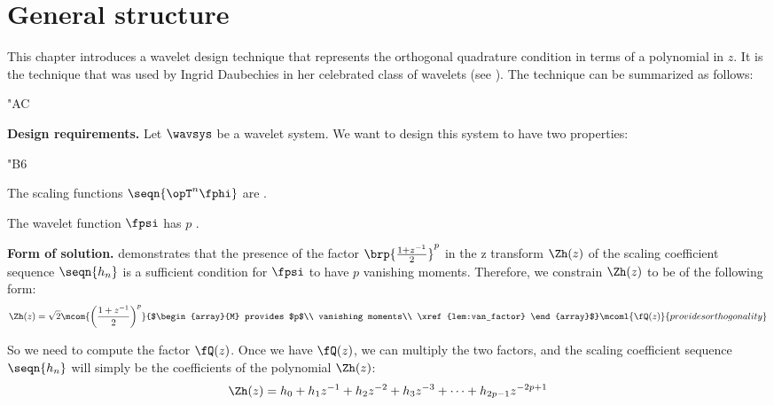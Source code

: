 \section{General structure}
This chapter introduces a wavelet design technique that represents the
orthogonal quadrature condition in terms of a polynomial in $z$.
It is the technique that was used by Ingrid Daubechies in her celebrated
 class of wavelets (see ).
The technique can be summarized as follows:
\begin{dingautolist}{"AC}
  \item \textbf{Design requirements.}
        Let $\wavsys$ be a wavelet system. %
        We want to design this system to have two properties:
    \begin{dingautolist}{"B6}
      \item The scaling functions $\seqn{\opT^n\fphi}$ are 
            .
      \item The wavelet function $\fpsi$ has $p$  .
    \end{dingautolist}

  \item \textbf{Form of solution.}
         demonstrates that the presence of the
        factor $\brp{\frac{1+z^{-1}}{2}}^p$
        in the z transform $\Zh(z)$ of the scaling coefficient sequence $\seqn{h_n}$
        is a sufficient condition for $\fpsi$ to have $p$ vanishing moments.
        Therefore, we constrain $\Zh(z)$ to be of the following form:
        \[
          \Zh(z) =
          \sqrt{2}\mcom{\left(\frac{1+z^{-1}}{2}\right)^p}
                       {$\begin{array}{M}
                           provides $p$\\
                           vanishing moments\\
                           \xref{lem:van_factor}
                         \end{array}$}
          \mcoml{\fQ(z)}{provides orthogonality}
        \]

        So we need to compute the factor $\fQ(z)$.
        Once we have $\fQ(z)$, we can multiply the two factors,
        and the scaling coefficient sequence $\seqn{h_n}$ will simply be the coefficients
        of the polynomial $\Zh(z)$:
        \[ \Zh(z) = h_0 + h_1 z^{-1} + h_2 z^{-2} + h_3 z^{-3} + \cdots + h_{2p-1}z^{-2p+1}\]


\end{dingautolist}
